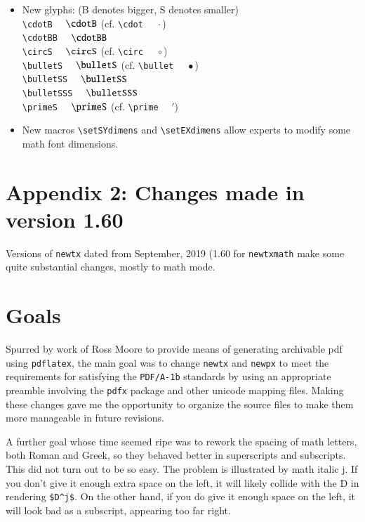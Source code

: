 \documentclass[11pt]{article}
\theoremstyle{oldplain}
\theoremstyle{plain}
\begin{document}
\begin{itemize}
\verb|\hattilde|$\quad\hattilde{}$\\
\verb|\hathat|$\quad\hathat{}$\\
\item New glyphs: (B denotes bigger, S denotes smaller)\\
\verb|\cdotB| $\quad\cdotB$ (cf. \verb|\cdot| $\quad\cdot$)\\
\verb|\cdotBB| $\quad\cdotBB$\\
\verb|\circS| $\quad\circS$ (cf. \verb|\circ| $\quad\circ$)\\
\verb|\bulletS| $\quad\bulletS$ (cf. \verb|\bullet| $\quad\bullet$)\\
\verb|\bulletSS| $\quad\bulletSS$\\
\verb|\bulletSSS| $\quad\bulletSSS$\\
\verb|\primeS| $\quad\primeS$ (cf. \verb|\prime| $\quad\prime$)\\

\item New macros \verb|\setSYdimens| and \verb|\setEXdimens| allow experts to modify some math font dimensions.

\end{itemize}

\def\jj{\mkern-3mu j}

\section{Appendix 2: Changes made in version 1.60}
Versions of {\tt newtx}  dated from September, 2019 (1.60 for {\tt newtxmath} make some quite substantial changes, mostly to math mode. 

\section{Goals}
Spurred by work of Ross Moore to provide means of generating archivable pdf using {\tt pdflatex}, the main goal was to change {\tt newtx} and {\tt newpx} to meet the requirements for satisfying the {\tt PDF/A-1b} standards by using an appropriate preamble involving the {\tt pdfx} package and other unicode mapping files. Making these  changes  gave me the opportunity to organize the source files to make them more manageable in  future revisions. 

A further goal whose time seemed ripe was to rework the  spacing of math letters, both Roman and Greek, so they behaved better in superscripts and subscripts. This did not turn out to be so easy. The problem is illustrated by math italic j. If you don't give it enough extra space on the left, it will likely collide with the D in rendering \verb|$D^j$|. On the other hand, if you do give it enough space on the left, it will look bad as a  subscript, appearing too far right. 
\end{document}
